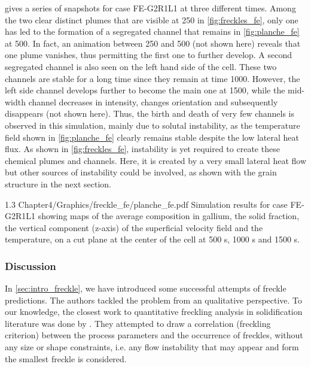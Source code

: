  gives a series of snapshots for case FE-G2R1L1 at three different times. Among the two clear distinct 
plumes that are visible at \SI{250}{\utime} in \cref{fig:freckles_fe}, only one has led to the formation of a segregated channel
that remains in \cref{fig:planche_fe} at \SI{500}{\utime}. 
In fact, an animation between \SI{250}{\utime} and \SI{500}{\utime} (not shown here) reveals that one plume vanishes, 
thus permitting the first one to further develop. A second segregated channel is also seen on the left hand side of the cell. 
These two channels are stable for a long time since they remain at time \SI{1000}{\utime}. However, the left side channel 
develops further to become the main one at \SI{1500}{\utime}, while the mid-width channel decreases in intensity, changes 
orientation and subsequently disappears (not shown here). Thus, the birth and death of very few channels is observed in this 
simulation, mainly due to solutal instability, as the temperature field shown in \cref{fig:planche_fe} clearly remains stable despite 
the low lateral heat flux. As shown in \cref{fig:freckles_fe}, instability is yet required to create these chemical plumes and channels. 
Here, it is created by a very small lateral heat flow but other sources of instability could be involved, as shown with the grain structure in the next section.

\begin{landscape}
\begin{figureth}
{1.3}
{Chapter4/Graphics/freckle_fe/planche_fe.pdf}
{Simulation results for case FE-G2R1L1 showing maps of the average composition in gallium,
the solid fraction, the vertical component (z-axis) of the superficial velocity field and the temperature, 
on a cut plane at the center of the cell at 500 s, 1000 s and 1500 s.}
\label{fig:planche_fe}
\end{figureth}
\end{landscape}


\subsubsection{Discussion}

In \cref{sec:intro_freckle}, we have introduced some successful attempts of freckle predictions. 
The authors tackled the problem from an qualitative perspective. 
To our knowledge, the closest work to quantitative freckling analysis in solidification literature was done by \citet{ramirez_evaluation_2003}.
They attempted to draw a correlation (freckling criterion) between the process parameters and the occurrence of freckles, 
without any size or shape constraints, i.e. any flow instability that may appear and form the smallest freckle is considered. 

